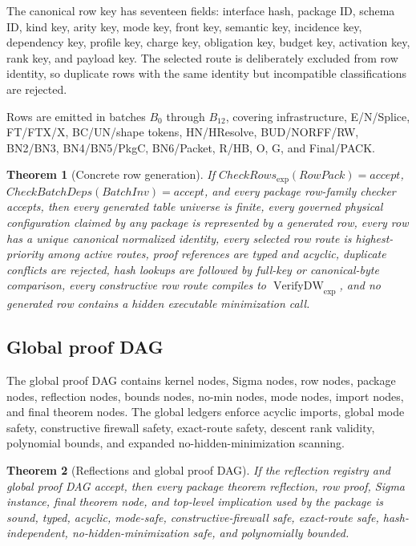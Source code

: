 \documentclass[10.5pt,a4paper]{article}
\newtheorem{theorem}{Theorem}[section]
\newcommand{\VerifyDW}{\operatorname{VerifyDW}_{\exp}}
\begin{document}
The canonical row key has seventeen fields: interface hash, package ID, schema ID, kind key, arity key, mode key, front key, semantic key, incidence key, dependency key, profile key, charge key, obligation key, budget key, activation key, rank key, and payload key. The selected route is deliberately excluded from row identity, so duplicate rows with the same identity but incompatible classifications are rejected.

Rows are emitted in batches \(B_0\) through \(B_{12}\), covering infrastructure, E/N/Splice, FT/FTX/X, BC/UN/shape tokens, HN/HResolve, BUD/NORFF/RW, BN2/BN3, BN4/BN5/PkgC, BN6/Packet, R/HB, O, G, and Final/PACK.

\begin{theorem}[Concrete row generation]
If \(CheckRows_{\exp}(RowPack)=accept\), \(CheckBatchDeps(BatchInv)=accept\), and every package row-family checker accepts, then every generated table universe is finite, every governed physical configuration claimed by any package is represented by a generated row, every row has a unique canonical normalized identity, every selected row route is highest-priority among active routes, proof references are typed and acyclic, duplicate conflicts are rejected, hash lookups are followed by full-key or canonical-byte comparison, every constructive row route compiles to \(\VerifyDW\), and no generated row contains a hidden executable minimization call.
\end{theorem}

\subsection{Global proof DAG}
The global proof DAG contains kernel nodes, Sigma nodes, row nodes, package nodes, reflection nodes, bounds nodes, no-min nodes, mode nodes, import nodes, and final theorem nodes. The global ledgers enforce acyclic imports, global mode safety, constructive firewall safety, exact-route safety, descent rank validity, polynomial bounds, and expanded no-hidden-minimization scanning.

\begin{theorem}[Reflections and global proof DAG]
If the reflection registry and global proof DAG accept, then every package theorem reflection, row proof, Sigma instance, final theorem node, and top-level implication used by the package is sound, typed, acyclic, mode-safe, constructive-firewall safe, exact-route safe, hash-independent, no-hidden-minimization safe, and polynomially bounded.
\end{theorem}
\end{document}
